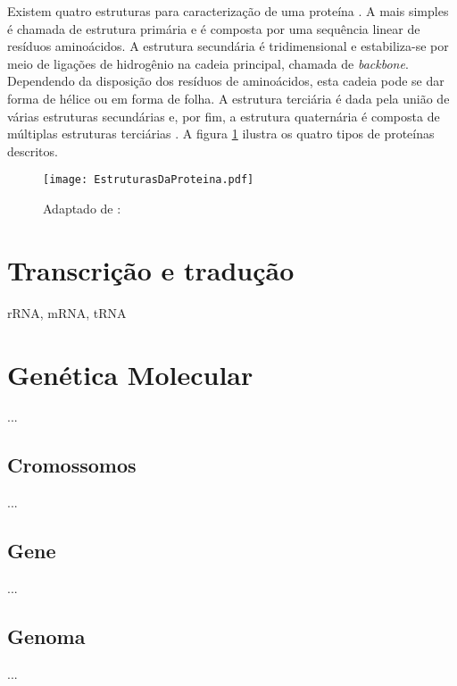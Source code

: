 \indent Existem quatro estruturas para caracterização de uma proteína \cite{setubal97}. A mais simples é chamada de estrutura primária e é composta por uma sequência linear de resíduos aminoácidos. A estrutura secundária é tridimensional e estabiliza-se por meio de ligações de hidrogênio na cadeia principal, chamada de \textit{backbone}. Dependendo da disposição dos resíduos de aminoácidos, esta cadeia pode se dar forma de hélice ou em forma de folha. A estrutura terciária é dada pela união de várias estruturas secundárias e, por fim, a estrutura quaternária é composta de múltiplas estruturas terciárias \cite{drug09}. A figura \ref{fig:EstruturasDaProteina} ilustra os quatro tipos de proteínas descritos.

\begin{figure}[h]
    \centering
    \texttt{[image: EstruturasDaProteina.pdf]}
    \caption{Adaptado de : \cite{drug09} }
    \label{fig:EstruturasDaProteina}
\end{figure}


\section{Transcrição e tradução} \label{aceidosNucleicos:transcricaoTraducaoSintese}

\indent rRNA, mRNA, tRNA





\section{Genética Molecular} \label{geneticaMolecular}

\indent ...



\subsection{Cromossomos} \label{geneticaMolecular:cromossomos}

\indent ...


\subsection{Gene} \label{geneticaMolecular:gene}

\indent ...


\subsection{Genoma} \label{geneticaMolecular:genoma}

\indent ...






